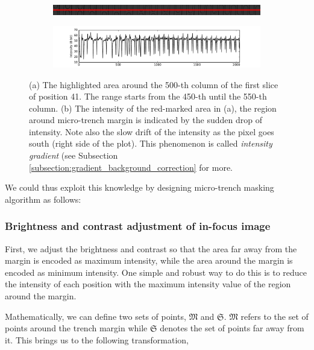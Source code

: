 \documentclass[pdftex,12pt,a4paper]{report}
\begin{document}
\begin{figure}[H]
\centering

\begin{subfigure}{\textwidth}
  \centering
  \includegraphics[width=\textwidth]{images/pos_41_cut_highlight_y_500}
  \caption{}
  \label{fig:pos41_highlight}
\end{subfigure}%

\begin{subfigure}{\textwidth}
  \centering
  \includegraphics[width=\textwidth]{images/pos_41_cut_highlight_y_500_contrast}
  \caption{}
  \label{fig:pos41_contrast}
\end{subfigure}%
\caption{(a) The highlighted area around the 500-th column of the first slice of position 41. The range starts from the 450-th until the 550-th column. (b) The intensity of the red-marked area in (a), the region around micro-trench margin is indicated by the sudden drop of intensity. Note also the slow drift of the intensity as the pixel goes south (right side of the plot). This phenomenon is called \textit{intensity gradient} (see Subsection \ref{subsection:gradient_background_correction} for more.}
\label{fig:pos41_brightness}
\end{figure}

We could thus exploit this knowledge by designing micro-trench masking algorithm as follows:

\subsubsection*{Brightness and contrast adjustment of in-focus image}

First, we adjust the brightness and contrast so that the area far away from the margin is encoded as maximum intensity, while the area around the margin is encoded as minimum intensity. One simple and robust way to do this is to reduce the intensity of each position with the maximum intensity value of the region around the margin.

Mathematically, we can define two sets of points, $\mathfrak{M}$ and $\mathfrak{S}$. $\mathfrak{M}$ refers to the set of points around the trench margin while $\mathfrak{S}$ denotes the set of points far away from it. This brings us to the following transformation,
\end{document}
